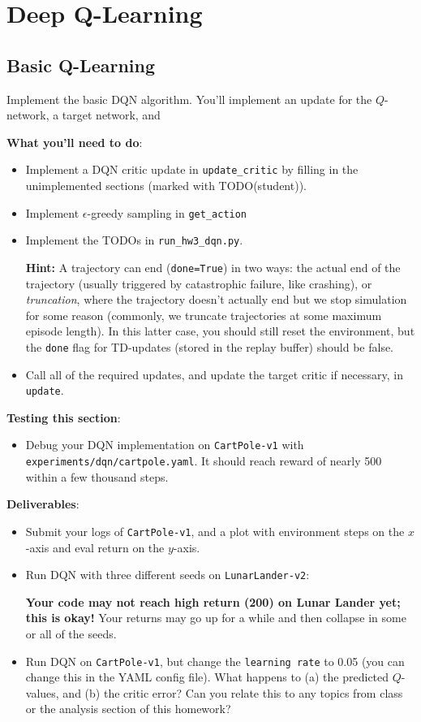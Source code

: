 \documentclass{article}
\begin{document}
\endgroup




\section{Deep Q-Learning}

\subsection{Basic Q-Learning}

Implement the basic DQN algorithm. You'll implement an update for the $Q$-network, a target network, and 

\textbf{What you'll need to do}:
\begin{itemize}
    \item Implement a DQN critic update in \verb|update_critic| by filling in the unimplemented sections (marked with TODO(student)).
    \item Implement $\epsilon$-greedy sampling in \verb|get_action|
    \item Implement the TODOs in \verb|run_hw3_dqn.py|.

    \textbf{Hint:} A trajectory can end (\verb|done=True|) in two ways: the actual end of the trajectory (usually triggered by catastrophic failure, like crashing), or \textit{truncation}, where the trajectory doesn't actually end but we stop simulation for some reason (commonly, we truncate trajectories at some maximum episode length). In this latter case, you should still reset the environment, but the \verb|done| flag for TD-updates (stored in the replay buffer) should be false.
    \item Call all of the required updates, and update the target critic if necessary, in \verb|update|.
\end{itemize}

\textbf{Testing this section}:
\begin{itemize}
    \item Debug your DQN implementation on \verb|CartPole-v1| with \verb|experiments/dqn/cartpole.yaml|. It should reach reward of nearly 500 within a few thousand steps.
\end{itemize}

\textbf{Deliverables}:
\begin{itemize}
    \item Submit your logs of \verb|CartPole-v1|, and a plot with environment steps on the $x$-axis and eval return on the $y$-axis.
    \item Run DQN with three different seeds on \verb|LunarLander-v2|:

\textbf{Your code may not reach high return (200) on Lunar Lander yet; this is okay!} Your returns may go up for a while and then collapse in some or all of the seeds.
    \item Run DQN on \verb|CartPole-v1|, but change the \verb|learning rate| to 0.05 (you can change this in the YAML config file). What happens to (a) the predicted $Q$-values, and (b) the critic error? Can you relate this to any topics from class or the analysis section of this homework?
\end{itemize}
\end{document}
